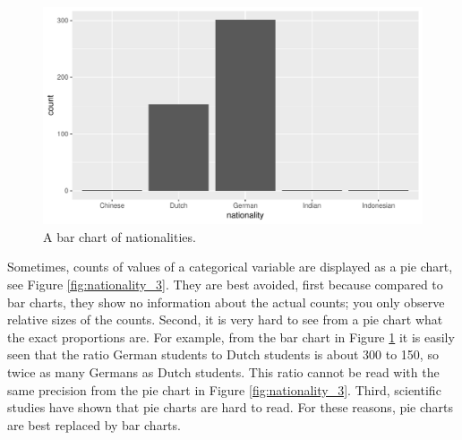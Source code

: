\documentclass[]{report}\usepackage[]{graphicx}\usepackage[]{color}
\makeatletter
\def\maxwidth{ %
  \ifdim\Gin@nat@width>\linewidth
    \linewidth
  \else
    \Gin@nat@width
  \fi
}
\newenvironment{knitrout}{}{} %
\makeatother
\begin{document}
\begin{knitrout}
\color{fgcolor}\begin{figure}

{\centering \includegraphics[width=\maxwidth]{figure/nationality_2-1} 

}

\caption[A bar chart of nationalities]{A bar chart of nationalities.}\label{fig:nationality_2}
\end{figure}


\end{knitrout}

Sometimes, counts of values of a categorical variable are displayed as a pie chart, see Figure \ref{fig:nationality_3}. They are best avoided, first because compared to bar charts, they show no information about the actual counts; you only observe relative sizes of the counts. Second, it is very hard to see from a pie chart what the exact proportions are. For example, from the bar chart in Figure \ref{fig:nationality_2} it is easily seen that the ratio German students to Dutch students is about 300 to 150, so twice as many Germans as Dutch students. This ratio cannot be read with the same precision from the pie chart in Figure \ref{fig:nationality_3}. Third, scientific studies have shown that pie charts are hard to read. For these reasons, pie charts are best replaced by bar charts.
\end{document}
